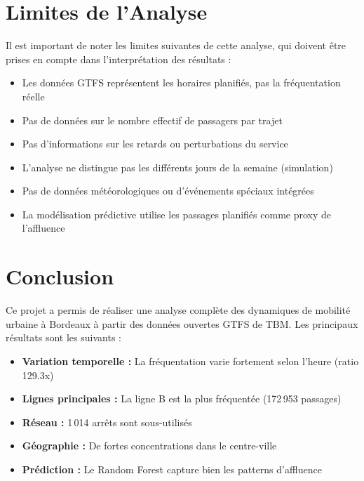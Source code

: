\documentclass[12pt,a4paper]{article}
\begin{document}
\section{Limites de l'Analyse}

Il est important de noter les limites suivantes de cette analyse, qui doivent être prises en compte dans l'interprétation des résultats :

\begin{itemize}[leftmargin=2cm]
    \item Les données GTFS représentent les horaires planifiés, pas la fréquentation réelle
    \item Pas de données sur le nombre effectif de passagers par trajet
    \item Pas d'informations sur les retards ou perturbations du service
    \item L'analyse ne distingue pas les différents jours de la semaine (simulation)
    \item Pas de données météorologiques ou d'événements spéciaux intégrées
    \item La modélisation prédictive utilise les passages planifiés comme proxy de l'affluence
\end{itemize}

\newpage
\section{Conclusion}

Ce projet a permis de réaliser une analyse complète des dynamiques de mobilité urbaine à Bordeaux à partir des données ouvertes GTFS de TBM. Les principaux résultats sont les suivants :

\begin{itemize}[leftmargin=2cm]
    \item \textbf{Variation temporelle :} La fréquentation varie fortement selon l'heure (ratio 129.3x)
    \item \textbf{Lignes principales :} La ligne B est la plus fréquentée (172\,953 passages)
    \item \textbf{Réseau :} 1\,014 arrêts sont sous-utilisés
    \item \textbf{Géographie :} De fortes concentrations dans le centre-ville
    \item \textbf{Prédiction :} Le Random Forest capture bien les patterns d'affluence
\end{itemize}
\end{document}
